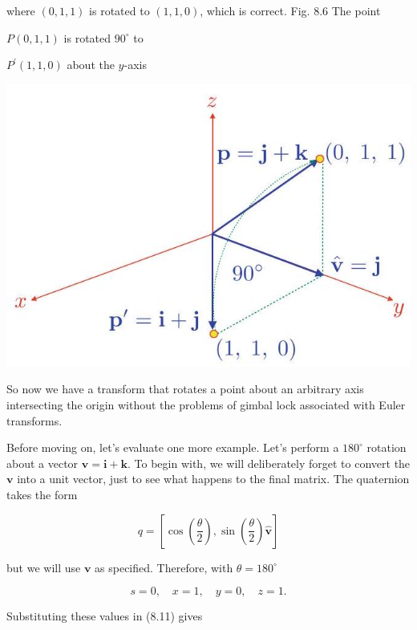 \documentclass[10pt]{article}
\begin{document}
where $(0,1,1)$ is rotated to $(1,1,0)$, which is correct. Fig. 8.6 The point

$P(0,1,1)$ is rotated $90^{\circ}$ to

$P^{\prime}(1,1,0)$ about the $y$-axis

\begin{center}
\includegraphics[max width=\textwidth]{2023_04_20_41f1ceac5a31dc7d1b59g-156}
\end{center}

So now we have a transform that rotates a point about an arbitrary axis intersecting the origin without the problems of gimbal lock associated with Euler transforms.

Before moving on, let's evaluate one more example. Let's perform a $180^{\circ}$ rotation about a vector $\mathbf{v}=\mathbf{i}+\mathbf{k}$. To begin with, we will deliberately forget to convert the $\mathbf{v}$ into a unit vector, just to see what happens to the final matrix. The quaternion takes the form

$$
q=\left[\cos \left(\frac{\theta}{2}\right), \sin \left(\frac{\theta}{2}\right) \hat{\mathbf{v}}\right]
$$

but we will use $\mathbf{v}$ as specified. Therefore, with $\theta=180^{\circ}$

$$
s=0, \quad x=1, \quad y=0, \quad z=1 .
$$

Substituting these values in (8.11) gives
\end{document}
